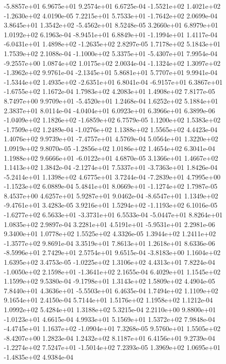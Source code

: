 -5.8857e+01  6.9675e+01  9.2574e+01  6.6725e-04
-1.5521e+02  1.4021e+02 -1.2630e+02  4.0190e-05
 7.2215e+01  5.7533e+01 -1.7642e+02  2.0699e-04
 3.8645e+01  1.3542e+02 -5.4562e+01  8.5248e-05
3.2660e+01 6.8979e+01 1.0192e+02  6.1963e-04
-8.9451e+01  6.8849e+01 -1.1994e+01  1.4117e-04
-6.0431e+01  1.4898e+02 -1.2635e+02  2.8297e-05
1.7178e+02 5.1843e+01 1.7539e+02  2.1088e-04
-1.1000e+02  5.3375e+01 -5.4307e+01  7.9954e-04
-9.2557e+00  1.0874e+02  1.0175e+02  2.0034e-04
-1.1324e+02  1.3097e+02 -1.3962e+02  9.9761e-04
-2.1345e+01  5.8681e+01  5.7707e+01  9.9941e-04
-1.5344e+02  1.4935e+02 -2.6351e+01  6.8041e-04
-6.9157e+01  6.3867e+01 -1.6755e+02  1.1672e-04
1.7983e+02 4.2083e+01 1.4908e+02  7.8177e-05
 8.7497e+00  9.9709e+01 -5.4520e+01  1.2468e-04
1.6252e+02 5.1884e+01 2.3837e+01  8.0114e-04
-4.0404e+01  6.0923e+01  6.3966e+01  6.3899e-06
-1.0409e+02  1.1826e+02 -1.6859e+02  6.7579e-05
 1.1200e+02  1.5383e+02 -1.7509e+02  1.2489e-04
-1.0276e+02  1.1388e+02  1.5565e+02  4.4423e-04
 1.4076e+02  9.9739e+01 -7.4757e+01  4.5769e-04
5.0564e+01 1.3220e+02 1.0919e+02  9.8070e-05
-1.2856e+02  1.0186e+02  1.4654e+02  6.3041e-04
 1.1988e+02  9.6666e+01 -6.0122e+01  4.6870e-05
3.1366e+01 1.4667e+02 1.1413e+02  1.3842e-04
-2.1274e+01  7.5337e+01 -3.7363e+01  1.8426e-04
-5.2414e+01  1.1398e+02  4.6775e+01  3.7244e-04
-7.2839e+01  4.7995e+00 -1.1523e+02  6.0889e-04
 5.4841e+01  8.0669e+01 -1.1274e+02  1.7987e-05
8.4537e+00 4.6257e+01 5.9287e+01  9.0462e-04
-8.6547e+01  1.1349e+02 -9.4761e+01  3.4283e-05
 3.9216e+01  1.5294e+02 -1.1193e+02  6.1016e-05
-1.6277e+02  6.5633e+01 -3.3731e+01  6.5533e-04
-5.0447e+01  8.8264e+01  1.0835e+02  2.9897e-04
 3.2281e+01  4.5191e+01 -5.9531e+01  2.2981e-06
9.3400e+01 1.0778e+02 1.5525e+02  4.3326e-05
 1.3944e+02  1.2411e+02 -1.3577e+02  9.8691e-04
3.3519e+01 7.8613e+01 1.2618e+01  8.6336e-06
-8.5996e+01  2.7429e+01  2.5754e+01  9.6515e-04
-3.8183e+00  1.1604e+02  1.6395e+02  3.4753e-05
-1.0225e+02  1.3106e+02  4.4313e+01  7.8224e-04
-1.0050e+02  2.1598e+01 -1.3641e+02  2.1655e-04
6.4029e+01 1.1545e+02 1.1599e+02  9.5380e-04
-9.1798e+01  1.3143e+02  1.5809e+02  4.4904e-05
 7.8440e+01  4.3636e+01 -5.5503e+01  6.4635e-04
1.7494e+02 1.1109e+02 9.1654e+01  2.4150e-04
5.7144e+01 1.5176e+02 1.1958e+02  1.1212e-04
1.0992e+02 5.4284e+01 1.3188e+02  5.3215e-04
 2.2110e+00  9.8800e+01 -1.0123e+01  4.6615e-04
4.9933e+01 5.1569e+01 1.5372e+02  7.9848e-04
-4.4745e+01  1.1637e+02 -1.0904e+01  7.3268e-05
 9.5760e+01  1.5505e+02 -8.4207e+00  1.2823e-04
1.2432e+02 8.1187e+01 6.4156e+01  9.2739e-04
-1.2274e+02  7.5247e+01 -1.5014e+02  7.2393e-05
 1.3969e+02  1.0695e+01 -1.4835e+02  4.9384e-04
